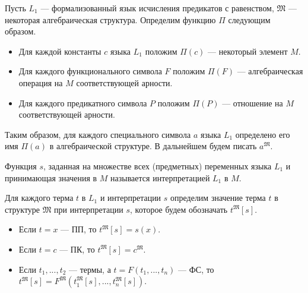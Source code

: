     \begin{Def}
        Пусть $L_1$ --- формализованный язык исчисления предикатов с равенством, $\mathfrak{M}$ --- некоторая алгебраическая структура. Определим функцию $\Pi$ следующим образом.
        \begin{itemize}
            \item Для каждой константы $c$ языка $L_1$ положим $\Pi(c)$ --- некоторый элемент $M$.
            \item Для каждого функционального символа $F$ положим $\Pi(F)$ --- алгебраическая операция на $M$ соответствующей арности.
            \item Для каждого предикатного символа $P$ положим $\Pi(P)$ --- отношение на $M$ соответствующей арности.
        \end{itemize}
        Таким образом, для каждого специального символа $a$ языка $L_1$ определено его имя $\Pi(a)$ в алгебраической структуре. В дальнейшем будем писать $a^{\mathfrak{M}}$.
    \end{Def}


    \begin{Def}
        Функция $s$, заданная на множестве всех (предметных) переменных языка $L_1$ и принимающая значения в $M$ называется интерпретацией $L_1$ в $M$.
    \end{Def}

    \begin{Def}
        Для каждого терма $t$ в $L_1$ и интерпретации $s$  определим значение терма $t$ в структуре $\mathfrak{M}$ при интерпретации $s$, которое будем обозначать $t^{\mathfrak{M}}[s]$.
        \begin{itemize}
            \item Если $t = x$ --- ПП, то $t^{\mathfrak{M}}[s] = s(x)$.
            \item Если $t = c$ --- ПК, то $t^{\mathfrak{M}}[s] = c^{\mathfrak{M}}$. 
            \item Если $t_1, ..., t_2$ --- термы, а $t = F(t_1, ..., t_n)$ --- ФС, то $t^{\mathfrak{M}}[s] = F^{\mathfrak{M}}(t_1^{\mathfrak{M}}[s], ..., t_n^{\mathfrak{M}}[s])$.
        \end{itemize}
    \end{Def}

